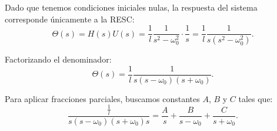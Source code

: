\documentclass[
  11pt,
  letterpaper,
   addpoints,
   answers
  ]{exam}
\begin{document}
\begin{questions}
\begin{solution}
Dado que tenemos condiciones iniciales nulas, la respuesta del sistema corresponde únicamente a la RESC:
\begin{equation}
\Theta(s) = H(s) U(s) = \frac{1}{l} \frac{1}{s^2 - \omega_0^2} \cdot \frac{1}{s} = \frac{1}{l} \frac{1}{s(s^2 - \omega_0^2)}.
\end{equation}

Factorizando el denominador:
\begin{equation}
\Theta(s) = \frac{1}{l} \frac{1}{s(s - \omega_0)(s + \omega_0)}.
\end{equation}

Para aplicar fracciones parciales, buscamos constantes \(A\), \(B\) y \(C\) tales que:
\begin{equation}
\frac{\frac{1}{l}}{s(s - \omega_0)(s + \omega_0)s} = \frac{A}{s} + \frac{B}{s - \omega_0} + \frac{C}{s + \omega_0}.
\end{equation}


\end{solution}
\end{questions}
\end{document}

